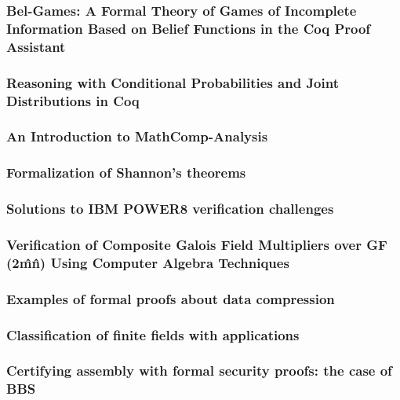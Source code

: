 \documentclass{article}
\begin{document}
\subsubsection{Bel-Games: A Formal Theory of Games of Incomplete Information Based on Belief Functions in the Coq Proof Assistant}

\subsubsection{Reasoning with Conditional Probabilities and Joint Distributions in Coq}

\subsubsection{An Introduction to MathComp-Analysis}

\subsubsection{Formalization of Shannon’s theorems}

\subsubsection{Solutions to IBM POWER8 verification challenges}

\subsubsection{Verification of Composite Galois Field Multipliers over GF (2\^m\^n) Using Computer Algebra Techniques}

\subsubsection{Examples of formal proofs about data compression}

\subsubsection{Classification of finite fields with applications}

\subsubsection{Certifying assembly with formal security proofs: the case of BBS}


\end{document}
